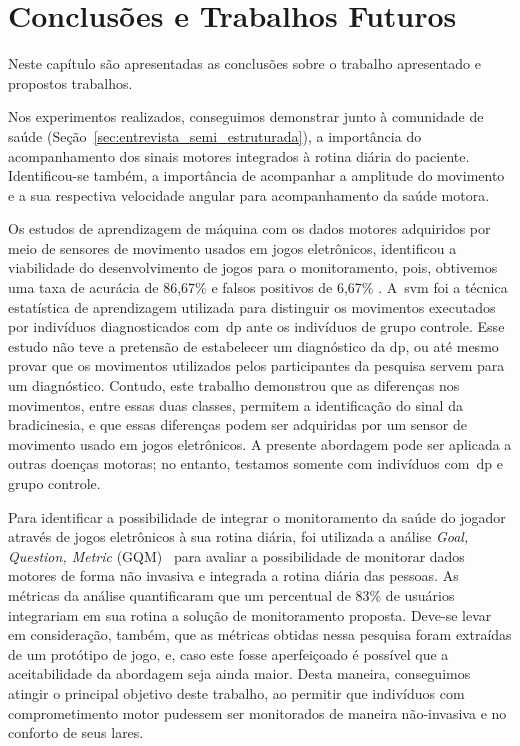 \chapter{Conclusões e Trabalhos Futuros}\label{chapter:conclusoes_futuros}
Neste capítulo são apresentadas as conclusões sobre o trabalho apresentado e propostos trabalhos.  


Nos experimentos realizados, conseguimos demonstrar junto à comunidade de saúde (Seção~\ref{sec:entrevista_semi_estruturada}), a importância do acompanhamento dos sinais motores integrados à rotina diária do paciente. Identificou-se também, a importância de acompanhar a amplitude do movimento e a sua respectiva velocidade angular para acompanhamento da saúde motora.

Os estudos de aprendizagem de máquina com os dados motores adquiridos por meio de sensores de movimento usados em jogos eletrônicos, identificou a viabilidade do desenvolvimento de jogos para o monitoramento, pois, obtivemos uma taxa de acurácia de 86,67\% e falsos positivos de 6,67\% . A~\ac{svm} foi a técnica estatística de aprendizagem utilizada para distinguir os movimentos executados por indivíduos diagnosticados com~\ac{dp} ante os indivíduos de grupo controle. Esse estudo não teve a pretensão de estabelecer um diagnóstico da \ac{dp}, ou até mesmo provar que os movimentos utilizados pelos participantes da pesquisa servem para um diagnóstico. Contudo, este trabalho demonstrou que as diferenças nos movimentos, entre essas duas classes, permitem a identificação do sinal da bradicinesia, e que essas diferenças podem ser adquiridas por um sensor de movimento usado em jogos eletrônicos. A presente abordagem pode ser aplicada a outras doenças motoras; no entanto, testamos somente com indivíduos com~\ac{dp} e grupo controle.

Para identificar a possibilidade de integrar o monitoramento da saúde do jogador através de jogos eletrônicos à sua rotina diária, foi utilizada a análise \textit{Goal, Question, Metric} (GQM)~\cite{basili94} para avaliar a possibilidade de monitorar dados motores de forma não invasiva e integrada a rotina diária das pessoas. As métricas da análise quantificaram que um percentual de 83\% de usuários integrariam em sua rotina a solução de monitoramento proposta. Deve-se levar em consideração, também, que as métricas obtidas nessa pesquisa foram extraídas de um protótipo de jogo, e, caso este fosse aperfeiçoado é possível que a aceitabilidade da abordagem seja ainda maior. Desta maneira, conseguimos atingir o principal objetivo deste trabalho, ao permitir que indivíduos com comprometimento motor pudessem ser monitorados de maneira não-invasiva e no conforto de seus lares.




